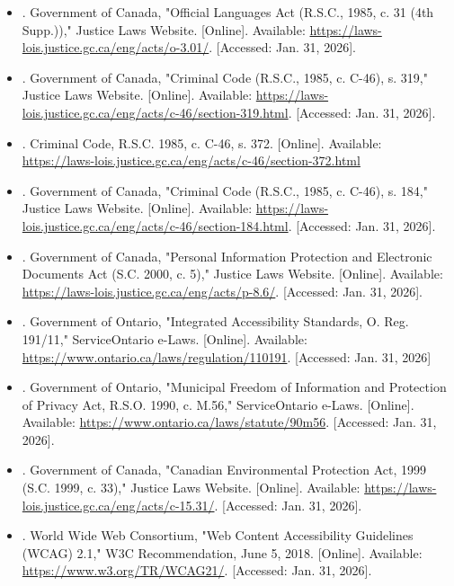 \documentclass[]{article}
\begin{document}
\begin{itemize}
	\item[] [22]. Government of Canada, "Official Languages Act (R.S.C., 1985, c. 31 (4th Supp.))," Justice Laws Website. [Online]. Available: \url{https://laws-lois.justice.gc.ca/eng/acts/o-3.01/}. [Accessed: Jan. 31, 2026].
	\item[] [23]. Government of Canada, "Criminal Code (R.S.C., 1985, c. C-46), s. 319," Justice Laws Website. [Online]. Available: \url{https://laws-lois.justice.gc.ca/eng/acts/c-46/section-319.html}. [Accessed: Jan. 31, 2026].
	\item[] [24]. Criminal Code, R.S.C. 1985, c. C-46, s. 372. [Online]. Available: \url{https://laws-lois.justice.gc.ca/eng/acts/c-46/section-372.html}
	\item[] [25]. Government of Canada, "Criminal Code (R.S.C., 1985, c. C-46), s. 184," Justice Laws Website. [Online]. Available: \url{https://laws-lois.justice.gc.ca/eng/acts/c-46/section-184.html}. [Accessed: Jan. 31, 2026].
	\item[] [26]. Government of Canada, "Personal Information Protection and Electronic Documents Act (S.C. 2000, c. 5)," Justice Laws Website. [Online]. Available: \url{https://laws-lois.justice.gc.ca/eng/acts/p-8.6/}. [Accessed: Jan. 31, 2026].
	\item[] [27]. Government of Ontario, "Integrated Accessibility Standards, O. Reg. 191/11," ServiceOntario e-Laws. [Online]. Available: \url{https://www.ontario.ca/laws/regulation/110191}. [Accessed: Jan. 31, 2026]
	\item[] [28]. Government of Ontario, "Municipal Freedom of Information and Protection of Privacy Act, R.S.O. 1990, c. M.56," ServiceOntario e-Laws. [Online]. Available: \url{https://www.ontario.ca/laws/statute/90m56}. [Accessed: Jan. 31, 2026].
	\item[] [29]. Government of Canada, "Canadian Environmental Protection Act, 1999 (S.C. 1999, c. 33)," Justice Laws Website. [Online]. Available: \url{https://laws-lois.justice.gc.ca/eng/acts/c-15.31/}. [Accessed: Jan. 31, 2026].
	\item[] [30]. World Wide Web Consortium, "Web Content Accessibility Guidelines (WCAG) 2.1," W3C Recommendation, June 5, 2018. [Online]. Available: \url{https://www.w3.org/TR/WCAG21/}. [Accessed: Jan. 31, 2026].
\end{itemize}
\end{document}

